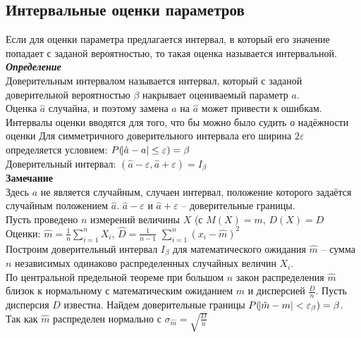\documentclass[russian, 12pt, fleqn]{article}
\begin{document}
\subsection{Интервальные оценки параметров}
Если для оценки параметра предлагается интервал, в который его значение попадает с заданой вероятностью, то такая оценка называется интервальной.\\
\textit{\textbf{Определение}} \\
Доверительным интервалом называется интервал, который с заданой доверительной вероятностью $\beta$ накрывает оцениваемый параметр $a$.\\
Оценка $\hat{a}$ случайна, и поэтому замена $a$ на $\hat{a}$ может привести к ошибкам. Интервалы оценки вводятся для того, что бы можно было судить о надёжности оценки Для симметричного доверительного интервала его ширина $2\varepsilon$ определяется условием: $P(\abs{\hat{a} - a} \leq \varepsilon) = \beta$\\
Доверительный интервал: $(\hat{a} - \varepsilon, \hat{a} + \varepsilon) = I_\beta$\\
\textbf{Замечание\ } \\
Здесь $a$ не является случайным, случаен интервал, положение которого задаётся случайным положением $\hat{a}$.
$ \hat{a} - \varepsilon$ и $\hat{a} + \varepsilon$ -- доверительные границы.\\
Пусть проведено  $n$ измерений величины $X$ (с $M(X)=m$, $D(X) = D$\\
 Оценки:  $\hat{m}= \frac{1}{n} \displaystyle{\sum\limits_{i=1} ^ {n}} X_i$, $\hat{D} = \frac{1}{n - 1}$  $\displaystyle{\sum \limits_{i=1} ^ {n}} (x_i - \hat{m})^2$\\
Построим доверительный интервал $I_\beta$ для математического ожидания $\hat{m}$ -- сумма $n$ независимых одинаково распределенных случайных величин $X_i$. \\
По центральной предельной теореме при большом $n$ закон распределения $\hat{m}$ близок к нормальному с математическим ожиданием $m$ и дисперсией $\frac{D}{n}$. Пусть дисперсия $D$ известна. Найдем доверительные границы $P(\abs{\hat{m} - m} < \varepsilon_\beta) = \beta$. 
Так как $\hat{m}$ распределен нормально с $\sigma_{\hat{m}} = \sqrt{\frac{D}{n}}$\\
\end{document}
